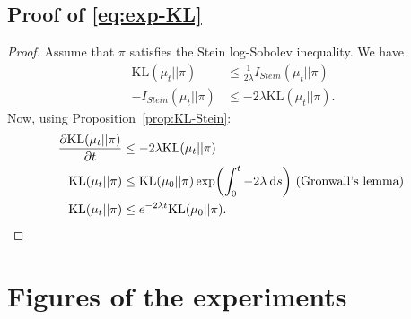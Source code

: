 \documentclass{article}
\newcommand{\KL}{\mathrm{KL}}
\newcommand{\diff}[2]{\frac{\partial #1}{\partial #2}}
\renewcommand{\d}{\: \mathrm{d}}
\DeclarePairedDelimiter{\pare}{(}{)}
\begin{document}
\subsection{Proof of \eqref{eq:exp-KL}}\label{pro:exp-KL}
\begin{proof}
  Assume that $\pi$ satisfies the Stein log-Sobolev inequality.
  We have
  \begin{align*}
    \KL(\mu_t || \pi) &\leq \frac{1}{2\lambda} I_{Stein}(\mu_t || \pi)\\
    -I_{Stein}(\mu_t || \pi) &\leq -2\lambda \KL(\mu_t || \pi).
  \end{align*}
  Now, using Proposition~\ref{prop:KL-Stein}:
  \begin{align*}
    \diff{\KL(\mu_t || \pi)}{t} &\leq -2\lambda \KL(\mu_t || \pi) \\
    \KL(\mu_t || \pi) &\leq \KL(\mu_0 || \pi) \exp \pare*{ \int_0^t -2 \lambda \d s }
    \text{ (Gronwall's lemma) } \\
    \KL(\mu_t || \pi) &\leq e^{-2\lambda t} \KL(\mu_0 || \pi).
  \end{align*}
    
\end{proof}

\section{Figures of the experiments}
\end{document}
